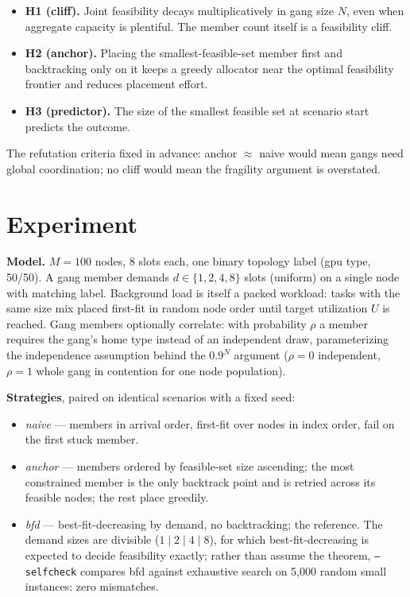 \documentclass[11pt]{article}
\newcommand{\code}[1]{\texttt{#1}}
\begin{document}
\begin{itemize}
\item \textbf{H1 (cliff).} Joint feasibility decays multiplicatively in
  gang size $N$, even when aggregate capacity is plentiful. The member
  count itself is a feasibility cliff.
\item \textbf{H2 (anchor).} Placing the smallest-feasible-set member first
  and backtracking only on it keeps a greedy allocator near the optimal
  feasibility frontier and reduces placement effort.
\item \textbf{H3 (predictor).} The size of the smallest feasible set at
  scenario start predicts the outcome.
\end{itemize}

The refutation criteria fixed in advance: anchor $\approx$ naive would mean
gangs need global coordination; no cliff would mean the fragility argument
is overstated.

\section{Experiment}

\textbf{Model.} $M = 100$ nodes, 8 slots each, one binary topology label
(gpu type, 50/50). A gang member demands $d \in \{1,2,4,8\}$ slots
(uniform) on a single node with matching label. Background load is itself a
packed workload: tasks with the same size mix placed first-fit in random
node order until target utilization $U$ is reached. Gang members optionally
correlate: with probability $\rho$ a member requires the gang's home type
instead of an independent draw, parameterizing the independence assumption
behind the $0.9^N$ argument ($\rho = 0$ independent, $\rho = 1$ whole gang
in contention for one node population).

\textbf{Strategies}, paired on identical scenarios with a fixed seed:

\begin{itemize}
\item \emph{naive} --- members in arrival order, first-fit over nodes in
  index order, fail on the first stuck member.
\item \emph{anchor} --- members ordered by feasible-set size ascending; the
  most constrained member is the only backtrack point and is retried across
  its feasible nodes; the rest place greedily.
\item \emph{bfd} --- best-fit-decreasing by demand, no backtracking; the
  reference. The demand sizes are divisible ($1 \mid 2 \mid 4 \mid 8$), for
  which best-fit-decreasing is expected to decide feasibility exactly;
  rather than assume the theorem, \code{--selfcheck} compares bfd against
  exhaustive search on 5{,}000 random small instances: zero mismatches.
\end{itemize}
\end{document}
